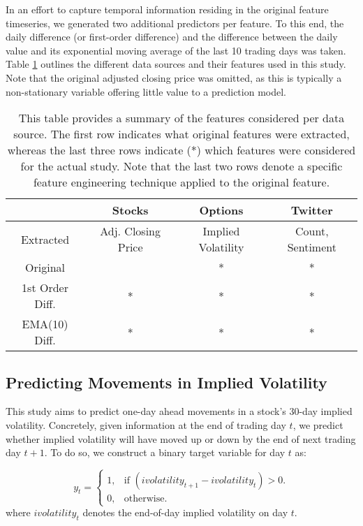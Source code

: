\documentclass[preprint,1p, times,authoryear]{elsarticle}
\begin{document}
In an effort to capture temporal information residing in the original feature timeseries, we generated two additional predictors per feature. To this end, the daily difference (or first-order difference) and the difference between the daily value and its exponential moving average of the last 10 trading days was taken. Table \ref{tab:features} outlines the different data sources and their features used in this study. Note that the original adjusted closing price was omitted, as this is typically a non-stationary variable offering little value to a prediction model. 


\begin{table}[!ht]
\setlength{\tabcolsep}{6pt}
 \caption{This table provides a summary of the features considered per data source. The first row indicates what original features were extracted, whereas the last three rows indicate (*) which features were considered for the actual study.  Note that the last two rows denote a specific feature engineering technique applied to the original feature. }
  \centering
  \begin{tabular}{cccc}
    \toprule
    & Stocks  & Options & Twitter \\
    \midrule
    Extracted & Adj. Closing Price & Implied Volatility & Count, Sentiment \\
    \midrule
    Original &      & * & * \\
    1st Order Diff. & * & * & * \\
    EMA(10) Diff. & * & * & * \\
                    

    \bottomrule
  \end{tabular}
  \label{tab:features}
\end{table}

\subsection{Predicting Movements in Implied Volatility}
\label{meth:pred}
This study aims to predict one-day ahead movements in a stock's 30-day implied volatility. Concretely,  given information at the end of trading day $t$, we predict whether implied volatility will have moved up or down by the end of next trading day $t+1$. To do so, we construct a binary target variable for day $t$ as:

\begin{equation}
  y_{t}=
  \begin{cases}
    1, & \text{if $(\mathit{ivolatility}_{t+1}-\mathit{ivolatility}_{t})>0$}.\\
    0, & \text{otherwise}.
  \end{cases}
  \label{eq:target}
\end{equation}
where $\mathit{ivolatility_{t}}$ denotes the end-of-day implied volatility on day $t$.
\end{document}
